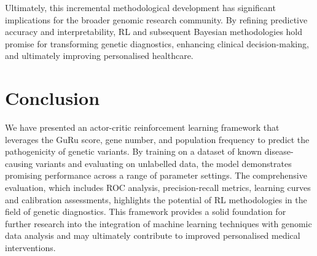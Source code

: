 Ultimately, this incremental methodological development has significant implications for the broader genomic research community. By refining predictive accuracy and interpretability, RL and subsequent Bayesian methodologies hold promise for transforming genetic diagnostics, enhancing clinical decision-making, and ultimately improving personalised healthcare.




\clearpage
\section{Conclusion}
We have presented an actor-critic reinforcement learning framework that leverages the GuRu score, gene number, and population frequency to predict the pathogenicity of genetic variants. By training on a dataset of known disease-causing variants and evaluating on unlabelled data, the model demonstrates promising performance across a range of parameter settings. The comprehensive evaluation, which includes ROC analysis, precision-recall metrics, learning curves and calibration assessments, highlights the potential of RL methodologies in the field of genetic diagnostics. This framework provides a solid foundation for further research into the integration of machine learning techniques with genomic data analysis and may ultimately contribute to improved personalised medical interventions.







\clearpage

  




